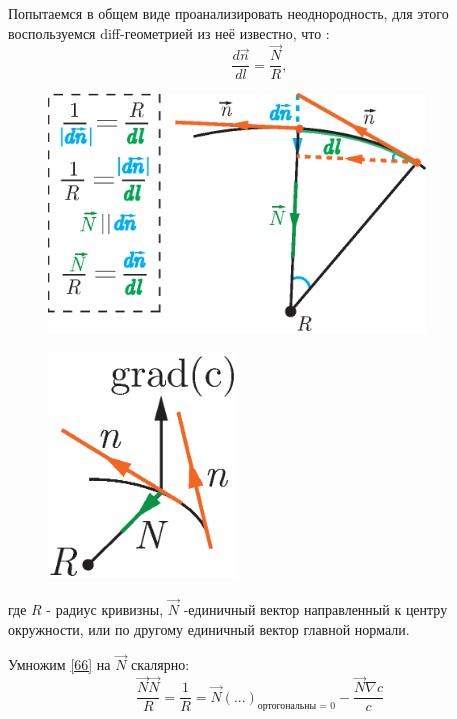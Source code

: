 \documentclass[14pt,a4paper,oneside]{extarticle}	%
\begin{document}
Попытаемся в общем виде проанализировать неоднородность, для этого воспользуемся diff-геометрией из неё известно, что :
\begin{equation}\label{67}
\frac{d\vec{n}}{dl} = \frac{\vec{N}}{R},
\end{equation}
\begin{figure}[h!] 	%
	\centering 		%
	\includegraphics[width=10cm]{8.eps} %
	\label{fig::7}
\end{figure}
\begin{figure}[h!] 	%
	\centering 		%
	\includegraphics[width=5cm]{7.eps} %
	\label{fig::8}
\end{figure}
где $ R $ - радиус кривизны, $ \vec{N}  $ -единичный вектор направленный к центру окружности, или по другому единичный вектор главной нормали.

Умножим \ref{66} на $ \vec{N}  $ скалярно:
\begin{equation*}
\frac{\vec{N} \vec{N} }{R} = \frac{1}{R} = \vec{N}(...)_{\text{ортогональны = 0}} - \frac{\vec{N} \nabla c }{c}
\end{equation*}
\end{document}
